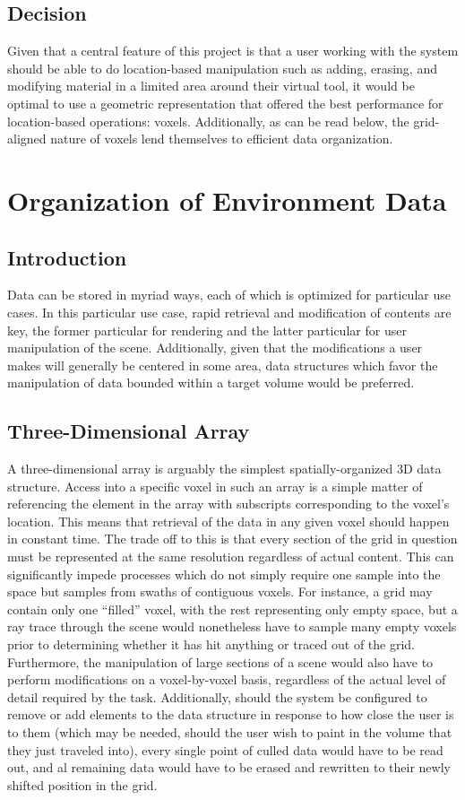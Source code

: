 \documentclass[onecolumn, draftclsnofoot,10pt, compsoc]{IEEEtran}
\begin{document}
\subsection{Decision}
Given that a central feature of this project is that a user working with the system should be able to do location-based manipulation such as adding, erasing, and modifying material in a limited area around their virtual tool, it would be optimal to use a geometric representation that offered the best performance for location-based operations: voxels. Additionally, as can be read below, the grid-aligned nature of voxels lend themselves to efficient data organization.


\section{Organization of Environment Data}
\subsection{Introduction}
Data can be stored in myriad ways, each of which is optimized for particular use cases. In this particular use case, rapid retrieval and modification of contents are key, the former particular for rendering and the latter particular for user manipulation of the scene. Additionally, given that the modifications a user makes will generally be centered in some area, data structures which favor the manipulation of data bounded within a target volume would be preferred.


\subsection{Three-Dimensional Array}
A three-dimensional array is arguably the simplest spatially-organized 3D data structure. Access into a specific voxel in such an array is a simple matter of referencing the element in the array with subscripts corresponding to the voxel’s location. This means that retrieval of the data in any given voxel should happen in constant time. The trade off to this is that every section of the grid in question must be represented at the same resolution regardless of actual content. This can significantly impede processes which do not simply require one sample into the space but samples from swaths of contiguous voxels. For instance, a grid may contain only one “filled” voxel, with the rest representing only empty space, but a ray trace through the scene would nonetheless have to sample many empty voxels prior to determining whether it has hit anything or traced out of the grid. Furthermore, the manipulation of large sections of a scene would also have to perform modifications on a voxel-by-voxel basis, regardless of the actual level of detail required by the task. Additionally, should the system be configured to remove or add elements to the data structure in response to how close the user is to them (which may be needed, should the user wish to paint in the volume that they just traveled into), every single point of culled data would have to be read out, and al remaining data would have to be erased and rewritten to their newly shifted position in the grid. 
\end{document}
